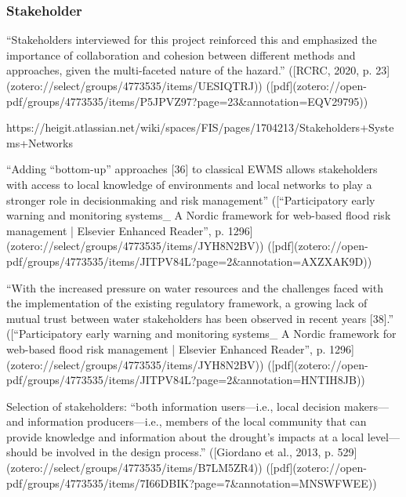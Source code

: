 {\subsubsection{Stakeholder}

“Stakeholders interviewed for this project reinforced this and emphasized the importance of collaboration and cohesion between different methods and approaches, given the multi-faceted nature of the hazard.” ([RCRC, 2020, p. 23](zotero://select/groups/4773535/items/UESIQTRJ)) ([pdf](zotero://open-pdf/groups/4773535/items/P5JPVZ97?page=23&annotation=EQV29795))

https://heigit.atlassian.net/wiki/spaces/FIS/pages/1704213/Stakeholders+Systems+Networks

“Adding “bottom-up” approaches [36] to classical EWMS allows stakeholders with access to local knowledge of environments and local networks to play a stronger role in decisionmaking and risk management” ([“Participatory early warning and monitoring systems_ A Nordic framework for web-based flood risk management | Elsevier Enhanced Reader”, p. 1296](zotero://select/groups/4773535/items/JYH8N2BV)) ([pdf](zotero://open-pdf/groups/4773535/items/JITPV84L?page=2&annotation=AXZXAK9D))

“With the increased pressure on water resources and the challenges faced with the implementation of the existing regulatory framework, a growing lack of mutual trust between water stakeholders has been observed in recent years [38].” ([“Participatory early warning and monitoring systems_ A Nordic framework for web-based flood risk management | Elsevier Enhanced Reader”, p. 1296](zotero://select/groups/4773535/items/JYH8N2BV)) ([pdf](zotero://open-pdf/groups/4773535/items/JITPV84L?page=2&annotation=HNTIH8JB))

Selection of stakeholders:
“both information users—i.e., local decision makers—and information producers—i.e., members of the local community that can provide knowledge and information about the drought’s impacts at a local level—should be involved in the design process.” ([Giordano et al., 2013, p. 529](zotero://select/groups/4773535/items/B7LM5ZR4)) ([pdf](zotero://open-pdf/groups/4773535/items/7I66DBIK?page=7\&annotation=MNSWFWEE))

}
